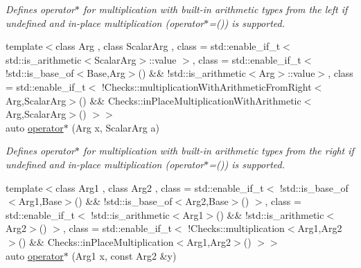\begin{DoxyCompactItemize}
\begin{DoxyCompactList}\small\item\em Defines operator$\ast$ for multiplication with built-\/in arithmetic types from the left if undefined and in-\/place multiplication (operator$\ast$=()) is supported. \end{DoxyCompactList}\item 
\hypertarget{namespaceFunG_a3cd5a2cb1abba842154691bb84aab896}{{\footnotesize template$<$class Arg , class Scalar\-Arg , class  = std\-::enable\-\_\-if\-\_\-t$<$ std\-::is\-\_\-arithmetic$<$\-Scalar\-Arg$>$\-::value $>$, class  = std\-::enable\-\_\-if\-\_\-t$<$ !std\-::is\-\_\-base\-\_\-of$<$\-Base,\-Arg$>$() \&\& !std\-::is\-\_\-arithmetic$<$\-Arg$>$\-::value$>$, class  = std\-::enable\-\_\-if\-\_\-t$<$ !\-Checks\-::multiplication\-With\-Arithmetic\-From\-Right$<$\-Arg,\-Scalar\-Arg$>$() \&\&                                       Checks\-::in\-Place\-Multiplication\-With\-Arithmetic$<$\-Arg,\-Scalar\-Arg$>$() $>$$>$ }\\auto \hyperlink{namespaceFunG_a3cd5a2cb1abba842154691bb84aab896}{operator$\ast$} (Arg x, Scalar\-Arg a)}\label{namespaceFunG_a3cd5a2cb1abba842154691bb84aab896}

\begin{DoxyCompactList}\small\item\em Defines operator$\ast$ for multiplication with built-\/in arithmetic types from the right if undefined and in-\/place multiplication (operator$\ast$=()) is supported. \end{DoxyCompactList}\item 
\hypertarget{namespaceFunG_ad023f2d2273af693f2b4ebceeb296dc8}{{\footnotesize template$<$class Arg1 , class Arg2 , class  = std\-::enable\-\_\-if\-\_\-t$<$ !std\-::is\-\_\-base\-\_\-of$<$\-Arg1,\-Base$>$() \&\& !std\-::is\-\_\-base\-\_\-of$<$\-Arg2,\-Base$>$() $>$, class  = std\-::enable\-\_\-if\-\_\-t$<$ !std\-::is\-\_\-arithmetic$<$\-Arg1$>$() \&\& !std\-::is\-\_\-arithmetic$<$\-Arg2$>$() $>$, class  = std\-::enable\-\_\-if\-\_\-t$<$ !\-Checks\-::multiplication$<$\-Arg1,\-Arg2$>$() \&\&                                       Checks\-::in\-Place\-Multiplication$<$\-Arg1,\-Arg2$>$() $>$$>$ }\\auto \hyperlink{namespaceFunG_ad023f2d2273af693f2b4ebceeb296dc8}{operator$\ast$} (Arg1 x, const Arg2 \&y)}\label{namespaceFunG_ad023f2d2273af693f2b4ebceeb296dc8}


\end{DoxyCompactItemize}
